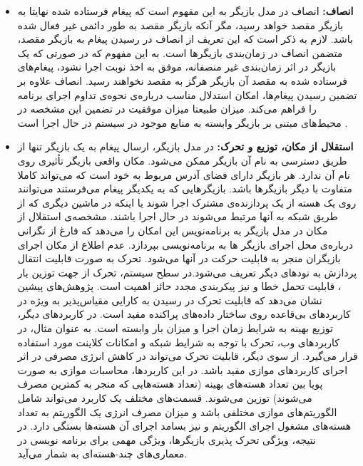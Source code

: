 \begin{itemize}
\item \textbf{ \gls{انصاف}:}
انصاف در مدل بازیگر به این مفهوم است که پیغام فرستاده شده نهایتا به بازیگر مقصد خواهد رسید، مگر آنکه بازیگر مقصد به طور دائمی غیر فعال شده باشد. لازم به ذکر است که این تعریف از  انصاف در رسیدن پیغام به بازیگر مقصد، متضمن انصاف در \gls{زمان‌بندی} بازیگر‌ها است. به این مفهوم که در صورتی که یک بازیگر در اثر  زمان‌بندی غیر منصفانه، موفق به اخذ نوبت اجرا نشود، پیغام‌های فرستاده شده به مقصد آن بازیگر هرگز به مقصد نخواهند رسید. انصاف علاوه بر تضمین رسیدن پیغام‌ها، امکان استدلال مناسب درباره‌ی نحوه‌ی تداوم اجرای  برنامه‌ را فراهم می‌کند. میزان طبیعتا میزان موفقیت در تضمین این مشخصه در محیط‌های مبتنی بر بازیگر وابسته به منابع موجود در سیستم در حال اجرا است \cite{ActorsJVM2009}.
\item \textbf{ استقلال از مکان، توزیع و تحرک:}
\label{mobility}
در مدل بازیگر، ارسال پیغام به یک بازیگر تنها از طریق دسترسی به نام آن بازیگر ممکن می‌شود. مکان واقعی بازیگر تأثیری روی نام آن ندارد. هر بازیگر دارای فضای آدرس مربوط به خود است که می‌تواند کاملا متفاوت با دیگر بازیگر‌ها باشد. بازیگرهایی که به یکدیگر پیغام می‌فرستند می‌توانند روی یک هسته از یک پردازنده‌ی مشترک اجرا شوند یا اینکه در ماشین دیگری که از طریق شبکه به آنها مرتبط می‌شوند در حال اجرا باشند. مشخصه‌ی  استقلال از مکان در مدل بازیگر به برنامه‌نویس این امکان را می‌دهد که فارغ از نگرانی درباره‌ی محل اجرای  بازیگر ها به برنامه‌نویسی بپردازد.
 عدم اطلاع از مکان اجرای بازیگران  منجر به قابلیت حرکت در آنها می‌شود. تحرک به صورت قابلیت انتقال پردازش به نودهای دیگر تعریف می‌شود.در سطح سیستم، تحرک از جهت توزین بار ، قابلیت تحمل خطا و نیز پیکربندی مجدد حائز 
 اهمیت است.
 پژوهش‌های پیشین نشان می‌دهد که قابلیت تحرک در رسیدن به کارایی \gls{مقیاس‌پذیر} به ویژه در کاربردهای  \gls{بی‌قاعده} روی ساختار داده‌های \gls{پراکنده} مفید است\cite{KimA95}. در کاربردهای دیگر، توزیع بهینه به شرایط زمان اجرا و میزان بار وابسته است. به عنوان مثال، در کاربردهای وب، تحرک با توجه به شرایط شبکه و امکانات کلاینت مورد استفاده قرار می‌گیرد\cite{ContextAwareWeb}.  
از سوی دیگر، قابلیت تحرک می‌تواند در کاهش انرژی مصرفی در اثر اجرای کاربردهای موازی مفید باشد. در این کاربردها، محاسبات موازی به صورت پویا بین تعداد هسته‌های بهینه (تعداد هسته‌هایی که منجر به کمترین مصرف می‌شوند) توزین می‌شوند. قسمت‌های مختلف یک کاربرد می‌تواند شامل الگوریتم‌های موازی مختلفی باشد و میزان مصرف انرژی یک الگوریتم به تعداد هسته‌های مشغول اجرای الگوریتم و نیز بسامد اجرای آن هسته‌ها بستگی دارد\cite{KorthikantiA10}. در نتیجه، ویژگی تحرک پذیری بازیگر‌ها، ویژگی مهمی برای برنامه نویسی در معماری‌های چند-هسته‌ای به شمار می‌آید.

\end{itemize} 



